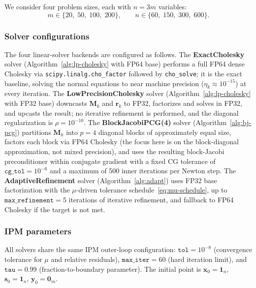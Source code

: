 \documentclass[11pt,twoside]{article}
\newcommand{\bx}{\mathbf{x}}
\newcommand{\by}{\mathbf{y}}
\newcommand{\bs}{\mathbf{s}}
\newcommand{\bM}{\mathbf{M}}
\newcommand{\br}{\mathbf{r}}
\begin{document}
We consider four problem sizes, each with $n = 3m$ variables:
\begin{equation}
  m \in \{20,\; 50,\; 100,\; 200\},\qquad
  n \in \{60,\; 150,\; 300,\; 600\}.
  \label{eq:problem-sizes}
\end{equation}

\subsubsection{Solver configurations}

The four linear-solver backends are configured as follows.  The
\textbf{ExactCholesky} solver (Algorithm~\ref{alg:lp-cholesky} with FP64
base) performs a full FP64 dense Cholesky via
\texttt{scipy.linalg.cho\_factor} followed by \texttt{cho\_solve}; it is
the exact baseline, solving the normal equations to near machine precision
($\eta_k \approx 10^{-15}$) at every iteration.  The
\textbf{LowPrecisionCholesky} solver (Algorithm~\ref{alg:lp-cholesky} with
FP32 base) downcasts $\bM_k$ and $\br_k$ to FP32, factorizes and solves in
FP32, and upcasts the result; no iterative refinement is performed, and the
diagonal regularization is $\rho = 10^{-10}$.  The
\textbf{BlockJacobiPCG(4)} solver (Algorithm~\ref{alg:bj-pcg}) partitions
$\bM_k$ into $p = 4$ diagonal blocks of approximately equal size, factors
each block via FP64 Cholesky (the focus here is on the block-diagonal
approximation, not mixed precision), and uses the resulting block-Jacobi
preconditioner within conjugate gradient with a fixed CG tolerance of
$\texttt{cg\_tol} = 10^{-6}$ and a maximum of 500 inner iterations per
Newton step.  The \textbf{AdaptiveRefinement} solver
(Algorithm~\ref{alg:adapt}) uses FP32 base factorization with the
$\mu$-driven tolerance schedule~\eqref{eq:mu-schedule}, up to
$\texttt{max\_refinement} = 5$ iterations of iterative refinement, and
fallback to FP64 Cholesky if the target is not met.

\subsubsection{IPM parameters}

All solvers share the same IPM outer-loop configuration:
$\texttt{tol} = 10^{-8}$ (convergence tolerance for $\mu$ and relative
residuals), $\texttt{max\_iter} = 60$ (hard iteration limit), and
$\texttt{tau} = 0.99$ (fraction-to-boundary parameter).  The initial
point is $\bx_0 = \mathbf{1}_n$, $\bs_0 = \mathbf{1}_n$, $\by_0 =
\mathbf{0}_m$.
\end{document}
